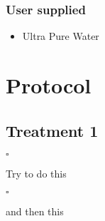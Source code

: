 \documentclass[a4paper,12pt]{article}
\newcommand{\checkbox}{$\square$\hspace{1mm}}
\newcommand{\icb}{\item \checkbox}
\begin{document}
	\subsubsection{User supplied}
	\begin{itemize}
	\item Ultra Pure Water
	\end{itemize}
\section{Protocol}
	\subsection{Treatment 1}
	\begin{enumerate}
		{\icb} Try to do this
		{\icb} and then this
	\end{enumerate}
\end{document}

